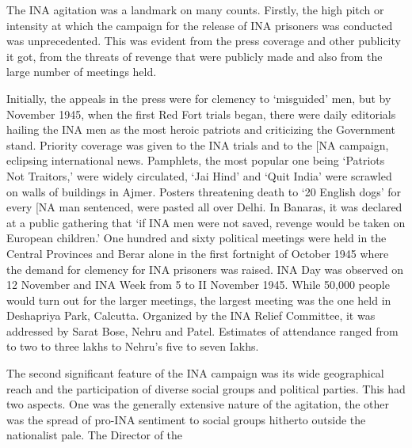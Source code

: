 The INA agitation was a landmark on many counts. Firstly, the high pitch or intensity at which the campaign for the release of INA prisoners was conducted was unprecedented. This was evident from the press coverage and other publicity it got, from the threats of revenge that were publicly made and also from the large number of meetings held. 

Initially, the appeals in the press were for clemency to `misguided' men, but by November 1945, when the first Red Fort trials began, there were daily editorials hailing the INA men as the most heroic patriots and criticizing the Government stand. Priority coverage was given to the INA trials and to the [NA campaign, eclipsing international news. Pamphlets, the most popular one being `Patriots Not Traitors,' were widely circulated, `Jai Hind' and `Quit India' were scrawled on walls of buildings in Ajmer. Posters threatening death to `20 English dogs' for every [NA man sentenced, were pasted all over Delhi. In Banaras, it was declared at a public gathering that `if INA men were not saved, revenge would be taken on European children.' One hundred and sixty political meetings were held in the Central Provinces and Berar alone in the first fortnight of October 1945 where the demand for clemency for INA prisoners was raised. INA Day was observed on 12 November and INA Week from 5 to II November 1945. While 50,000 people would turn out for the larger meetings, the largest meeting was the one held in Deshapriya Park, Calcutta. Organized by the INA Relief Committee, it was addressed by Sarat Bose, Nehru and Patel. Estimates of attendance ranged from to two to three lakhs to Nehru's five to seven Iakhs. 

The second significant feature of the INA campaign was its wide geographical reach and the participation of diverse social groups and political parties. This had two aspects. One was the generally extensive nature of the agitation, the other was the spread of pro-INA sentiment to social groups hitherto outside the nationalist pale. The Director of the 

